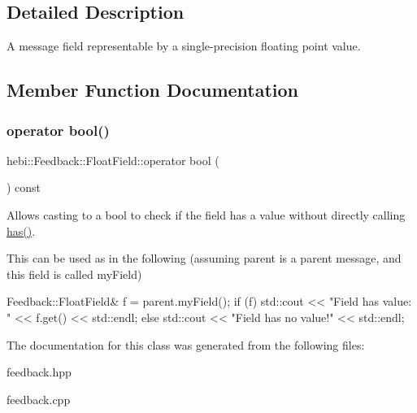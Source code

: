 \subsection{Detailed Description}
A message field representable by a single-\/precision floating point value. 

\subsection{Member Function Documentation}
\mbox{\label{classhebi_1_1Feedback_1_1FloatField_a3321ad9483e45f5871ee8af9c43e4828}} 
\subsubsection{\texorpdfstring{operator bool()}{operator bool()}}
{\footnotesize\ttfamily hebi\+::\+Feedback\+::\+Float\+Field\+::operator bool (\begin{DoxyParamCaption}{ }\end{DoxyParamCaption}) const\hspace{0.3cm}{\ttfamily [explicit]}}



Allows casting to a bool to check if the field has a value without directly calling {\ttfamily \hyperlink{classhebi_1_1Feedback_1_1FloatField_ac9fc1fc4ad1d2902395bf6113ceea93e}{has()}}. 

This can be used as in the following (assuming \textquotesingle{}parent\textquotesingle{} is a parent message, and this field is called \textquotesingle{}my\+Field\textquotesingle{}) 
\begin{DoxyCode}
Feedback::FloatField& f = parent.myField();
\textcolor{keywordflow}{if} (f)
  std::cout << \textcolor{stringliteral}{"Field has value: "} << f.get() << std::endl;
\textcolor{keywordflow}{else}
  std::cout << \textcolor{stringliteral}{"Field has no value!"} << std::endl;
\end{DoxyCode}
 

The documentation for this class was generated from the following files\+:\begin{DoxyCompactItemize}
\item 
feedback.\+hpp\item 
feedback.\+cpp\end{DoxyCompactItemize}
